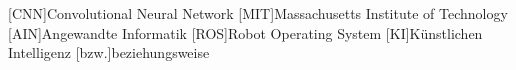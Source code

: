 
\begin{acronym}[ROS]
	[CNN]{Convolutional Neural Network}
	[MIT]{Massachusetts Institute of Technology}
	[AIN]{Angewandte Informatik}
	[ROS]{Robot Operating System}
	[KI]{Künstlichen Intelligenz}
	[bzw.]{beziehungsweise}
\end{acronym}
